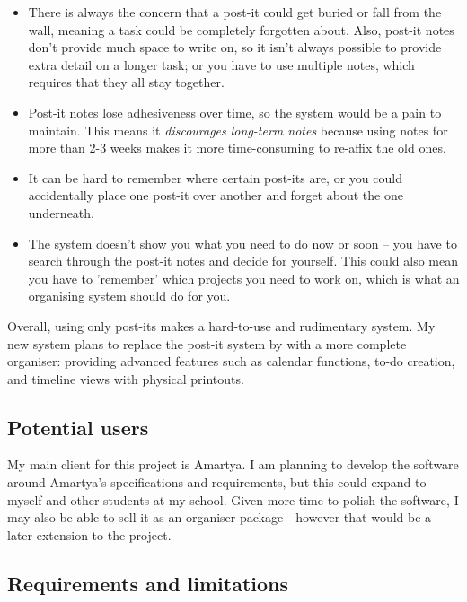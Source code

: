 \begin{itemize}
  \item There is always the concern that a post-it could get buried or fall
        from the wall, meaning a task could be completely forgotten about.
        Also, post-it notes don't provide much space to write on, so it isn't
        always possible to provide extra detail on a longer task; or you have to
        use multiple notes, which requires that they all stay together.
  \item Post-it notes lose adhesiveness over time, so the system would be a pain
        to maintain. This means it \textit{discourages long-term notes} because
        using notes for more than 2-3 weeks makes it more time-consuming to
        re-affix the old ones.
  \item It can be hard to remember where certain post-its are, or you could
        accidentally place one post-it over another and forget about the one
        underneath.
  \item The system doesn't show you what you need to do now or soon -- you have
        to search through the post-it notes and decide for yourself. This could
        also mean you have to 'remember' which projects you need to work on,
        which is what an organising system should do for you.
\end{itemize}

Overall, using only post-its makes a hard-to-use and rudimentary system. My new
system plans to replace the post-it system by with a more complete organiser:
providing advanced features such as calendar functions, to-do creation, and
timeline views with physical printouts.


\subsection{Potential users}

My main client for this project is Amartya. I am planning to develop the
software around Amartya's specifications and requirements, but this could
expand to myself and other students at my school. Given more time to polish the
software, I may also be able to sell it as an organiser package - however that
would be a later extension to the project.


\subsection{Requirements and limitations}

